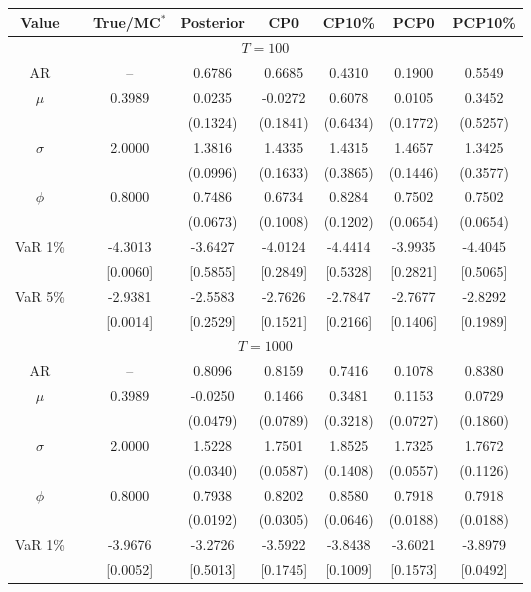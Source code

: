 { \renewcommand{\arraystretch}{1.2} 
\begin{table} 
\center 
\begin{tabular}{cc cccccc} 
Value & & True/MC$^*$ & Posterior & CP0  & CP10\% & PCP0  & PCP10\% \\ \hline 
\hline 
\multicolumn{8}{c}{$T =100$}  \\ 
\hline 
AR && -- & 0.6786 & 0.6685 & 0.4310 & 0.1900 & 0.5549 \\  
$\mu$&& 0.3989 & 0.0235 & -0.0272 & 0.6078 & 0.0105 & 0.3452 \\ 
&&   & (0.1324) & (0.1841) & (0.6434) & (0.1772) & (0.5257) \\ 
$\sigma$&& 2.0000 & 1.3816 & 1.4335 & 1.4315 & 1.4657 & 1.3425 \\ 
&&   & (0.0996) & (0.1633) & (0.3865) & (0.1446) & (0.3577) \\ 
$\phi$&& 0.8000 & 0.7486 & 0.6734 & 0.8284 & 0.7502 & 0.7502 \\ 
&&   & (0.0673) & (0.1008) & (0.1202) & (0.0654) & (0.0654) \\ 
VaR 1\% && -4.3013 & -3.6427 & -4.0124 & -4.4414 & -3.9935 & -4.4045 \\ 
  && [0.0060] & [0.5855] & [0.2849] & [0.5328] & [0.2821] & [0.5065] \\ 
VaR 5\% && -2.9381 & -2.5583 & -2.7626 & -2.7847 & -2.7677 & -2.8292 \\ 
 && [0.0014] & [0.2529] & [0.1521] & [0.2166] & [0.1406] & [0.1989] \\ 
\hline 
\multicolumn{8}{c}{$T =1000$}  \\ 
\hline 
AR && -- & 0.8096 & 0.8159 & 0.7416 & 0.1078 & 0.8380 \\  
$\mu$&& 0.3989 & -0.0250 & 0.1466 & 0.3481 & 0.1153 & 0.0729 \\ 
&&   & (0.0479) & (0.0789) & (0.3218) & (0.0727) & (0.1860) \\ 
$\sigma$&& 2.0000 & 1.5228 & 1.7501 & 1.8525 & 1.7325 & 1.7672 \\ 
&&   & (0.0340) & (0.0587) & (0.1408) & (0.0557) & (0.1126) \\ 
$\phi$&& 0.8000 & 0.7938 & 0.8202 & 0.8580 & 0.7918 & 0.7918 \\ 
&&   & (0.0192) & (0.0305) & (0.0646) & (0.0188) & (0.0188) \\ 
VaR 1\% && -3.9676 & -3.2726 & -3.5922 & -3.8438 & -3.6021 & -3.8979 \\ 
  && [0.0052] & [0.5013] & [0.1745] & [0.1009] & [0.1573] & [0.0492] \\ 

\end{tabular}
\end{table}}
